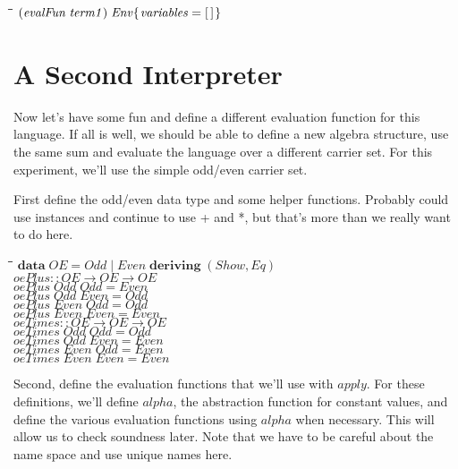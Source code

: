 \documentclass[10pt]{article}
\newlength{\lwidth}\setlength{\lwidth}{4.5cm}
\newlength{\cwidth}\setlength{\cwidth}{8mm} %
\newcommand{\Conid}[1]{\mathit{#1}}
\newcommand{\Varid}[1]{\mathit{#1}}
\begin{document}
\begin{tabbing}
\qquad\=\hspace{\lwidth}\=\hspace{\cwidth}\=\+\kill
${(\Varid{evalFun}\;\Varid{term1})\;\Conid{Env}\{\mskip1.5mu \Varid{variables}\mathrel{=}[\mskip1.5mu \mskip1.5mu]\mskip1.5mu\}}$
\end{tabbing}
\section{A Second Interpreter}

Now let's have some fun and define a different evaluation function for
this language.  If all is well, we should be able to define a new
algebra structure, use the same sum and evaluate the language over a
different carrier set.  For this experiment, we'll use the simple
odd/even carrier set.

First define the odd/even data type and some helper functions.
Probably could use instances and continue to use + and *, but that's
more than we really want to do here.

\begin{tabbing}
\qquad\=\hspace{\lwidth}\=\hspace{\cwidth}\=\+\kill
${\mathbf{data}\;\Conid{OE}\mathrel{=}\Conid{Odd}\mid \Conid{Even}\;\mathbf{deriving}\;(\Conid{Show},\Conid{Eq})}$\\
${}$\\
${\Varid{oePlus}\mathbin{::}\Conid{OE}\to \Conid{OE}\to \Conid{OE}}$\\
${\Varid{oePlus}\;\Conid{Odd}\;\Conid{Odd}\mathrel{=}\Conid{Even}}$\\
${\Varid{oePlus}\;\Conid{Odd}\;\Conid{Even}\mathrel{=}\Conid{Odd}}$\\
${\Varid{oePlus}\;\Conid{Even}\;\Conid{Odd}\mathrel{=}\Conid{Odd}}$\\
${\Varid{oePlus}\;\Conid{Even}\;\Conid{Even}\mathrel{=}\Conid{Even}}$\\
${}$\\
${\Varid{oeTimes}\mathbin{::}\Conid{OE}\to \Conid{OE}\to \Conid{OE}}$\\
${\Varid{oeTimes}\;\Conid{Odd}\;\Conid{Odd}\mathrel{=}\Conid{Odd}}$\\
${\Varid{oeTimes}\;\Conid{Odd}\;\Conid{Even}\mathrel{=}\Conid{Even}}$\\
${\Varid{oeTimes}\;\Conid{Even}\;\Conid{Odd}\mathrel{=}\Conid{Even}}$\\
${\Varid{oeTimes}\;\Conid{Even}\;\Conid{Even}\mathrel{=}\Conid{Even}}$
\end{tabbing}
Second, define the evaluation functions that we'll use with \ensuremath{\Varid{apply}}.
For these definitions, we'll define \ensuremath{\Varid{alpha}}, the abstraction function
for constant values, and define the various evaluation functions using
\ensuremath{\Varid{alpha}} when necessary.  This will allow us to check soundness later.
Note that we have to be careful about the name space and use unique
names here.
\end{document}
